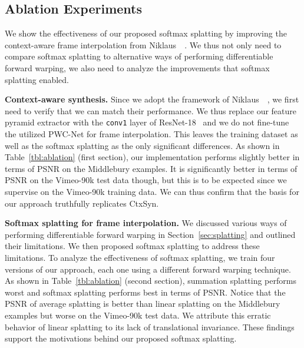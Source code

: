\documentclass[10pt,twocolumn,letterpaper]{article}
\begin{document}
\subsection{Ablation Experiments}\label{sec:ablation}

We show the effectiveness of our proposed softmax splatting by improving the context-aware frame interpolation from Niklaus~\etal~\cite{Niklaus_CVPR_2018}. We thus not only need to compare softmax splatting to alternative ways of performing differentiable forward warping, we also need to analyze the improvements that softmax splatting enabled.

\vspace{0.05in}
\noindent\textbf{Context-aware synthesis.} Since we adopt the framework of Niklaus~\etal~\cite{Niklaus_CVPR_2018}, we first need to verify that we can match their performance. We thus replace our feature pyramid extractor with the \texttt{conv1} layer of ResNet-18~\cite{He_CVPR_2016} and we do not fine-tune the utilized PWC-Net for frame interpolation. This leaves the training dataset as well as the softmax splatting as the only significant differences. As shown in Table~\ref{tbl:ablation} (first section), our implementation performs slightly better in terms of PSNR on the Middlebury examples. It is significantly better in terms of PSNR on the Vimeo-90k test data though, but this is to be expected since we supervise on the Vimeo-90k training data. We can thus confirm that the basis for our approach truthfully replicates CtxSyn.

\vspace{0.05in}
\noindent\textbf{Softmax splatting for frame interpolation.} We discussed various ways of performing differentiable forward warping in Section~\ref{sec:splatting} and outlined their limitations. We then proposed softmax splatting to address these limitations. To analyze the effectiveness of softmax splatting, we train four versions of our approach, each one using a different forward warping technique. As shown in Table~\ref{tbl:ablation} (second section), summation splatting performs worst and softmax splatting performs best in terms of PSNR. Notice that the PSNR of average splatting is better than linear splatting on the Middlebury examples but worse on the Vimeo-90k test data. We attribute this erratic behavior of linear splatting to its lack of translational invariance. These findings support the motivations behind our proposed softmax splatting.
\end{document}
